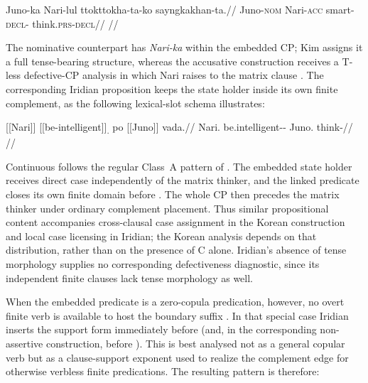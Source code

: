 \ex\label{ex:korean-ecm-comparison}%
\begingl
\gla Juno-ka Nari-lul ttokttokha-ta-ko sayngkakhan-ta.//
\glb Juno-\textsc{nom} Nari-\textsc{acc} smart-\textsc{decl}-\Compl{} think.\textsc{prs}-\textsc{decl}//
\glft {}
//
\endgl
\xe

The nominative counterpart has \textit{Nari-ka} within the embedded CP;
Kim assigns it a full tense-bearing structure, whereas the accusative
construction receives a T-less defective-CP analysis in which Nari raises
to the matrix clause \cite[p.~24, (55)--(56)]{kimboram2024phase}.
The corresponding Iridian proposition keeps the state holder inside its
own finite complement, as the following lexical-slot schema illustrates:

\ex\label{ex:iridian-local-complement-state}%
\begingl
\gla \textnormal{[[Nari]]}\textsubscript{\Dir{}} \textnormal{[[be-intelligent]]}\textsubscript{\Cont{}.\Lnk{}} po \textnormal{[[Juno]]}\textsubscript{\Dir{}} vada.//
\glb Nari.\Dir{} be.intelligent-\Cont{}-\Lnk{} \Compl{} Juno.\Dir{} think-\Cont{}//
\glft {}
//
\endgl
\xe

Continuous  follows the regular Class~A pattern of 
. The embedded state holder receives direct case independently of
the matrix thinker, and the linked predicate closes its own finite domain before
. The whole CP then precedes the matrix thinker under ordinary
complement placement. Thus similar propositional content accompanies
cross-clausal case assignment in the Korean construction and local case
licensing in Iridian; the Korean analysis depends on that distribution,
rather than on the presence of C alone. Iridian's absence of tense
morphology supplies no corresponding defectiveness diagnostic, since its
independent finite clauses lack tense morphology as well.

When the embedded predicate is a zero-copula predication, however, no overt
finite verb is available to host the boundary suffix . In that special
case Iridian inserts the support form  immediately before 
(and, in the corresponding non-assertive construction, before ).
This  is best analysed not as a general copular verb but as a
clause-support exponent used to realize the complement edge for otherwise
verbless finite predications. The resulting pattern is therefore:

